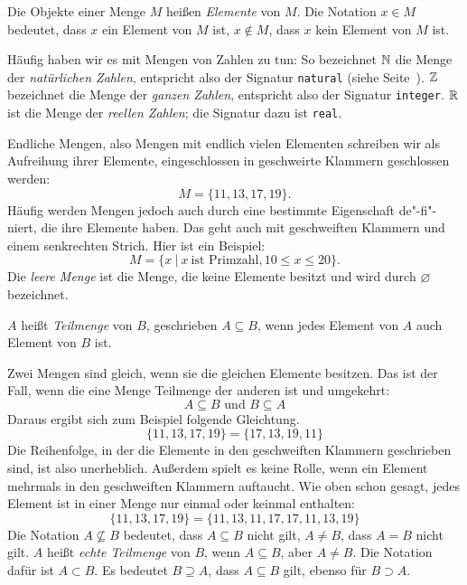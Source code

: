 Die Objekte einer Menge $M$ heißen \textit{Elemente} von $M$. Die Notation
$ x \in M$ 
bedeutet, dass $x$ ein Element von $M$ ist, $x \not \in M$, dass $x$ kein
Element von $M$ ist.

Häufig haben wir es mit Mengen von Zahlen zu tun: So bezeichnet
$\mathbb{N}$ die Menge der \emph{natürlichen
  Zahlen}, entspricht also der Signatur
\lstinline{natural} (siehe
Seite~\pageref{page:natural}). $\mathbb{Z}$ bezeichnet die
Menge der \emph{ganzen Zahlen}, entspricht also
der Signatur \lstinline{integer}. $\mathbb{R}$ ist die Menge
der \emph{reellen Zahlen}; die Signatur dazu ist
\lstinline{real}.

Endliche Mengen, also Mengen mit endlich vielen Elementen
schreiben wir als Aufreihung ihrer Elemente, 
eingeschlossen in geschweirte Klammern geschlossen werden:
\[M = \{ 11, 13, 17, 19\}.\]
Häufig werden Mengen jedoch auch durch eine bestimmte Eigenschaft de"-fi"-niert,
die ihre Elemente haben.  Das geht auch mit geschweiften Klammern und
einem senkrechten Strich.  Hier ist ein Beispiel:
%
\[M = \{x\ |\ x\ \mbox{ist Primzahl}, 10 \le x \le 20\}.\]
%
Die \emph{leere Menge} %
ist die Menge, die keine Elemente besitzt und wird
durch $\varnothing$ bezeichnet.

$A$ heißt \textit{Teilmenge} von $B$, geschrieben $A \subseteq B$, 
wenn jedes Element von $A$ auch Element von $B$ ist.

Zwei Mengen sind gleich, wenn sie die gleichen Elemente besitzen.  Das
ist der Fall, wenn die eine Menge Teilmenge der anderen ist und umgekehrt:
%
\[A \subseteq B \text{ und } B \subseteq A\]
%
Daraus ergibt sich zum Beispiel folgende Gleichtung.
%
\[\{11,13,17,19\} =\{17,13,19,11\}\]
%
Die Reihenfolge, in der die Elemente in den geschweiften Klammern
geschrieben sind, ist also unerheblich.  Außerdem spielt es keine
Rolle, wenn ein Element mehrmals in den geschweiften Klammern
auftaucht.  Wie oben schon gesagt, jedes Element ist in einer Menge
nur einmal oder keinmal enthalten:
\[\{11,13,17,19\} = \{11,13,11,17,17,11,13,19\}\]
%
Die Notation $A \not \subseteq B$ bedeutet, dass $A \subseteq B$ nicht gilt, $A
\not = B$, dass $A = B$ nicht gilt. $A$ heißt \emph{echte Teilmenge} von $B$,
wenn $A \subseteq B$, aber $A \not = B$. Die Notation dafür ist $A \subset B$.
Es bedeutet $B \supseteq A$, dass $A \subseteq B$ gilt, ebenso für
$B \supset A$. 

